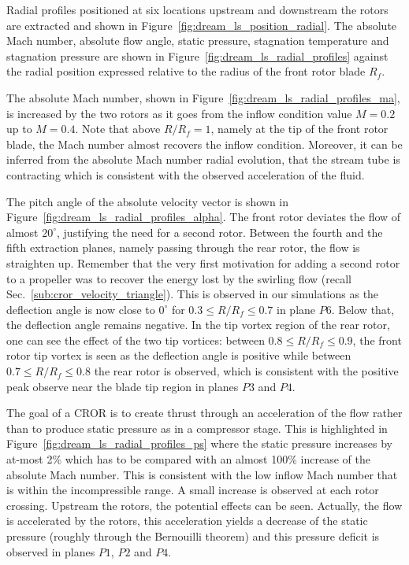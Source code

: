 Radial profiles positioned at six locations upstream and downstream the rotors
are extracted and shown in Figure~\ref{fig:dream_ls_position_radial}.
The absolute
Mach number, absolute flow angle, static pressure, 
stagnation temperature and stagnation pressure
are shown in Figure~\ref{fig:dream_ls_radial_profiles}
against the radial position expressed
relative to the radius of the front rotor blade $R_f$.

The absolute Mach number, shown in 
Figure~\ref{fig:dream_ls_radial_profiles_ma}, is increased by
the two rotors as it goes from the inflow condition value $M=0.2$
up to $M=0.4$. Note that above $R/R_f=1$, namely at the tip
of the front rotor blade, the Mach number
almost recovers the inflow condition. Moreover, it can be inferred from the
absolute Mach number radial evolution, that the stream tube is contracting which is consistent
with the observed acceleration of the fluid.

The pitch angle of the absolute velocity vector is shown in 
Figure~\ref{fig:dream_ls_radial_profiles_alpha}. The front rotor
deviates the flow of almost $20^\circ$, justifying the need
for a second rotor. Between the fourth and the fifth extraction planes, namely
passing through the rear rotor, the flow is straighten up. Remember that 
the very first motivation for adding a second rotor to a propeller
was to recover the energy lost by the swirling flow
(recall Sec.~\ref{sub:cror_velocity_triangle}). This is observed in our simulations as
the deflection angle is now close to $0^\circ$ for $0.3 \leq R/R_f \leq 0.7$
in plane $P6$.
Below that, the deflection angle remains negative. In the tip vortex region
of the rear rotor, one can see the effect of the two tip vortices: between 
$0.8 \leq R/R_f \leq 0.9$, the front rotor tip vortex is seen as the 
deflection angle is positive while between $0.7 \leq R/R_f \leq 0.8$
the rear rotor is observed, 
which is consistent with the positive
peak observe near the blade tip region in planes $P3$ and $P4$.

The goal of a CROR is to create thrust through an acceleration of 
the flow rather than to produce static pressure as in a compressor stage.
This is highlighted in Figure~\ref{fig:dream_ls_radial_profiles_ps}
where the static pressure increases by at-most 2\% which has to 
be compared with an almost 100\% increase of the absolute
Mach number. This is consistent with the low inflow Mach number
that is within the incompressible range.
A small increase is observed at each
rotor crossing. Upstream the rotors, the potential effects can
be seen. Actually, the flow is accelerated by the rotors, this acceleration
yields a decrease of the static pressure 
(roughly through the Bernouilli theorem) and this pressure deficit is observed in
planes $P1$, $P2$ and $P4$.

